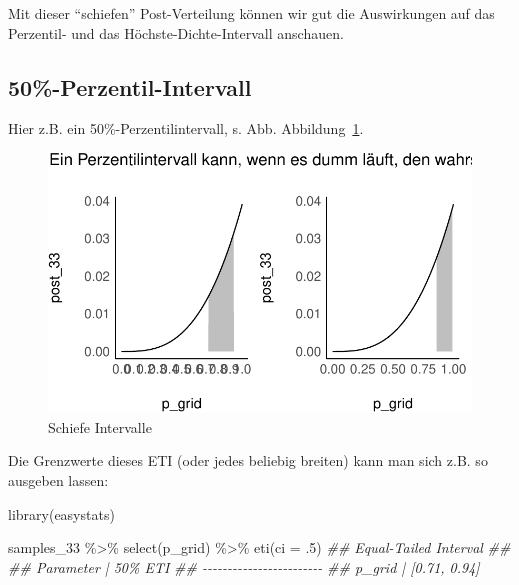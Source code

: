 \documentclass[
  a4paper,
  DIV=11]{scrreprt}
\newenvironment{Shaded}{\begin{snugshade}}{\end{snugshade}}
\newcommand{\AttributeTok}[1]{\textcolor[rgb]{0.40,0.45,0.13}{#1}}
\newcommand{\DecValTok}[1]{\textcolor[rgb]{0.68,0.00,0.00}{#1}}
\newcommand{\DocumentationTok}[1]{\textcolor[rgb]{0.37,0.37,0.37}{\textit{#1}}}
\newcommand{\FunctionTok}[1]{\textcolor[rgb]{0.28,0.35,0.67}{#1}}
\newcommand{\NormalTok}[1]{\textcolor[rgb]{0.00,0.23,0.31}{#1}}
\newcommand{\SpecialCharTok}[1]{\textcolor[rgb]{0.37,0.37,0.37}{#1}}
\theoremstyle{definition}
\theoremstyle{remark}
\begin{document}
Mit dieser ``schiefen'' Post-Verteilung können wir gut die Auswirkungen
auf das Perzentil- und das Höchste-Dichte-Intervall anschauen.

\hypertarget{perzentil-intervall}{%
\subsection{50\%-Perzentil-Intervall}\label{perzentil-intervall}}

Hier z.B. ein 50\%-Perzentilintervall, s. Abb.
Abbildung~\ref{fig-schief}.

\begin{figure}

{\centering \includegraphics{./Post_files/figure-pdf/fig-schief-1.pdf}

}

\caption{\label{fig-schief}Schiefe Intervalle}

\end{figure}

Die Grenzwerte dieses ETI (oder jedes beliebig breiten) kann man sich
z.B. so ausgeben lassen:

\begin{Shaded}
\begin{Highlighting}[]
\FunctionTok{library}\NormalTok{(easystats)}

\NormalTok{samples\_33 }\SpecialCharTok{\%\textgreater{}\%} 
  \FunctionTok{select}\NormalTok{(p\_grid) }\SpecialCharTok{\%\textgreater{}\%} 
  \FunctionTok{eti}\NormalTok{(}\AttributeTok{ci =}\NormalTok{ .}\DecValTok{5}\NormalTok{)}
\DocumentationTok{\#\# Equal{-}Tailed Interval}
\DocumentationTok{\#\# }
\DocumentationTok{\#\# Parameter |      50\% ETI}
\DocumentationTok{\#\# {-}{-}{-}{-}{-}{-}{-}{-}{-}{-}{-}{-}{-}{-}{-}{-}{-}{-}{-}{-}{-}{-}{-}{-}}
\DocumentationTok{\#\# p\_grid    | [0.71, 0.94]}
\end{Highlighting}
\end{Shaded}
\end{document}
